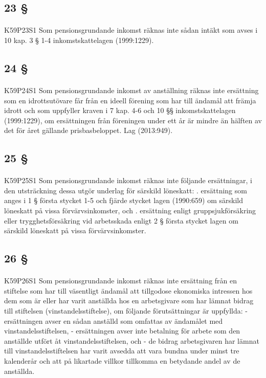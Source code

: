 \documentclass[a4paper,notitlepage,openany,10pt]{book}
\begin{document}
\subsection*{23 §}
\paragraph*{}
{\tiny K59P23S1}
Som pensionsgrundande inkomst räknas inte sådan intäkt som avses i 10 kap. 3 § 1-4 inkomstskattelagen (1999:1229).
\subsection*{24 §}
\paragraph*{}
{\tiny K59P24S1}
Som pensionsgrundande inkomst av anställning räknas inte ersättning som en idrottsutövare får från en ideell förening som har till ändamål att främja idrott och som uppfyller kraven i 7 kap. 4-6 och 10 §§ inkomstskattelagen (1999:1229), om ersättningen från föreningen under ett år är mindre än hälften av det för året gällande prisbasbeloppet.
Lag (2013:949).
\subsection*{25 §}
\paragraph*{}
{\tiny K59P25S1}
Som pensionsgrundande inkomst räknas inte följande ersättningar, i den utsträckning dessa utgör underlag för särskild löneskatt:
. ersättning som anges i 1 § första stycket 1-5 och fjärde stycket lagen (1990:659) om särskild löneskatt på vissa förvärvsinkomster, och
. ersättning enligt gruppsjukförsäkring eller trygghetsförsäkring vid arbetsskada enligt 2 § första stycket lagen om särskild löneskatt på vissa förvärvsinkomster.
\subsection*{26 §}
\paragraph*{}
{\tiny K59P26S1}
Som pensionsgrundande inkomst räknas inte ersättning från en stiftelse som har till väsentligt ändamål att tillgodose ekonomiska intressen hos dem som är eller har varit anställda hos en arbetsgivare som har lämnat bidrag till stiftelsen (vinstandelsstiftelse), om följande förutsättningar är uppfyllda: - ersättningen avser en sådan anställd som omfattas av ändamålet med vinstandelsstiftelsen, - ersättningen avser inte betalning för arbete som den anställde utfört åt vinstandelsstiftelsen, och - de bidrag arbetsgivaren har lämnat till vinstandelsstiftelsen har varit avsedda att vara bundna under minst tre kalenderår och att på likartade villkor tillkomma en betydande andel av de anställda.
\end{document}
